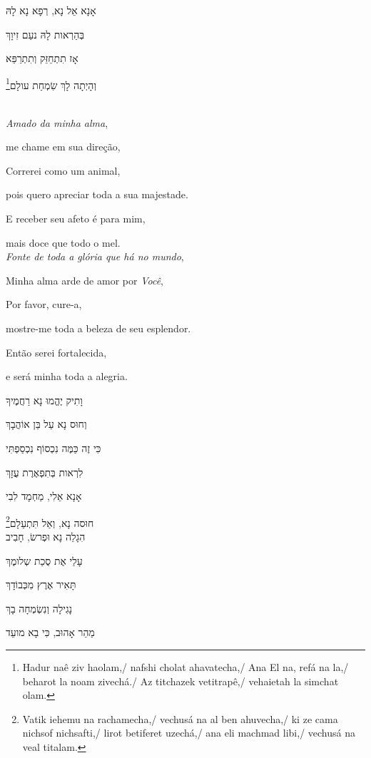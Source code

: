 אָנָא אֵל נָא, רְפָא נָא לָהּ

בְּהַרְאות לָהּ נעַם זִיוָךְ

אָז תִתְחֵזֵּק וְתִתְרַפֵּא

וְהָיְתָה לָךְ שִׂמְחַת עולָם\footnote{Hadur naê ziv haolam,/ nafshi cholat ahavatecha,/ Ana El na, refá na la,/ beharot la noam zivechá./ Az titchazek vetitrapê,/ vehaietah la simchat olam.}\\[10pt]


\movetooddpage
\raggedright

\textbf{}\\[15pt]

\emph{Amado da minha alma},

me chame em sua direção,

Correrei como um animal,

pois quero apreciar toda a sua majestade.

E receber seu afeto é para mim,

mais doce que todo o mel.\\[10pt]

\emph{Fonte de toda a glória que há no mundo},

Minha alma arde de amor por \emph{Você},

Por favor, cure-a,

mostre-me toda a beleza de seu esplendor.

Então serei fortalecida,

e será minha toda a alegria.

\movetoevenpage
\raggedleft

וָתִיק יֶהֱמוּ נָא רַחֲמֶיךָ

וְחוּס נָא עַל בֵּן אוֹהֲבָךְ

כִּי זֶה כַּמֶּה נִכְסוֹף נִכְסַפְתִּי

לִרְאות בְּתִפְאֶרֶת עֻזָךְ

אָנָא אֵלִי, מַחְמָד לִבִי

חוּסה נָא, וְאַל תִּתְעַלָם\footnote{Vatik iehemu na rachamecha,/
vechusá na al ben ahuvecha,/ ki ze cama nichsof nichsafti,/ lirot betiferet uzechá,/
ana eli machmad libi,/ vechusá na veal titalam.}\\[10pt]

הִגָלֵה נָא וּפְרשׂ, חָבִיב

עָלַי אֶת סֻכַת שְלומֶךְ

תָּאִיר אֶרֶץ מִכְּבוֹדָךְ

נָגִילָה וְנִשְׂמְחָה בָךְ

מַהֵר אָהוּב, כִּי בָא מועֵד

